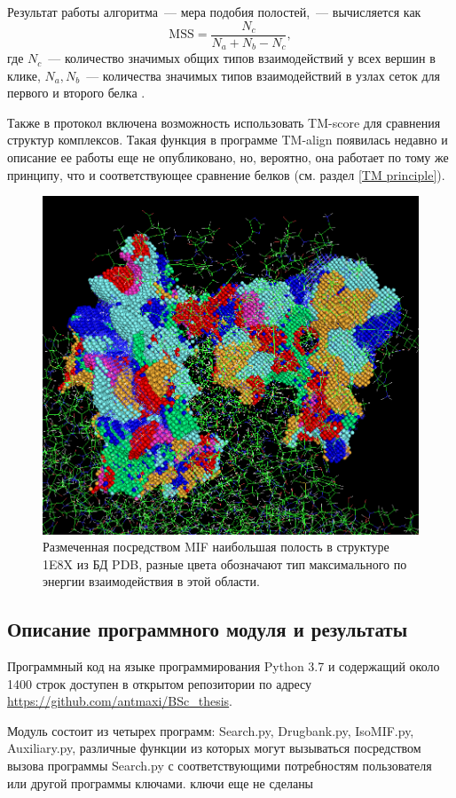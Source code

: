 \documentclass[a4paper,14pt]{article}         %
\begin{document}
Результат работы алгоритма~--- мера подобия полостей,~--- вычисляется как
\begin{equation}
\text{MSS} = \frac{N_c}{N_a + N_b - N_c},
\end{equation}
где $N_c$~--- количество значимых общих типов взаимодействий у всех вершин в клике, $N_a, N_b$~--- количества значимых типов взаимодействий в узлах сеток для первого и второго белка \cite{Chartier2015}.  

Также в протокол включена возможность использовать TM-score для сравнения структур комплексов. Такая функция в программе TM-align появилась недавно и описание ее работы еще не опубликовано, но, вероятно, она работает по тому же принципу, что и соответствующее сравнение белков (см. раздел \ref{TM principle}).
\begin{figure} 
		\centering
		\includegraphics[width=0.6\linewidth]{pictures/mif}
		\caption{Размеченная посредством MIF наибольшая полость в структуре 1E8X из БД PDB, разные цвета обозначают тип максимального по энергии взаимодействия в этой области.}
		\label{fig:mif}
\end{figure}
\newpage
\subsection{Описание программного модуля и результаты}
Программный код на языке программирования Python 3.7 \cite{python37} и содержащий около 1400 строк доступен в открытом репозитории по адресу \href{https://github.com/antmaxi/BSc\_thesis}{https://github.com/antmaxi/BSc\_thesis}.

Модуль состоит из четырех программ: Search.py, Drugbank.py, IsoMIF.py, Auxiliary.py, различные функции из которых могут вызываться посредством вызова программы Search.py с соответствующими потребностям пользователя или другой программы ключами. \color{orange} ключи еще не сделаны \color{black}
\end{document}
